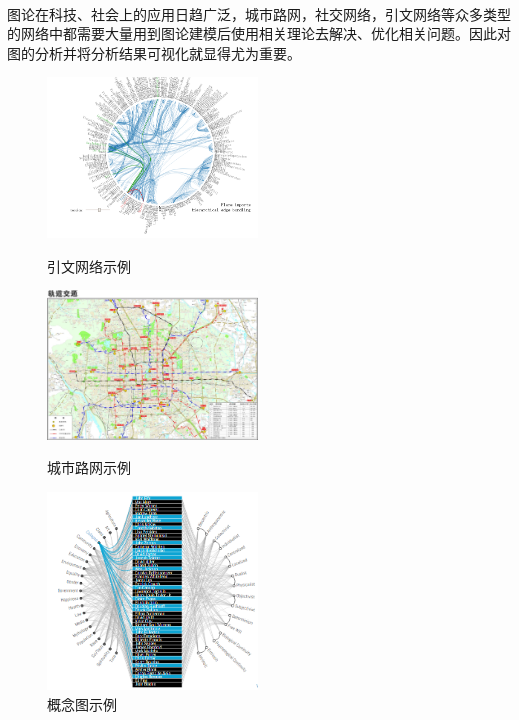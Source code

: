 \documentclass{article}
\begin{document}
\begin{CJK}{UTF8}{gkai}
	\paragraph{}
	图论在科技、社会上的应用日趋广泛，城市路网，社交网络，引文网络等众多类型的网络中都需要大量用到图论建模后使用相关理论去解决、优化相关问题。因此对图的分析并将分析结果可视化就显得尤为重要。
	\begin{figure}[htbp!]
		\begin{minipage}[t]{0.33\linewidth}
			\centering
			\includegraphics[width=2.2in]{graph.PNG}
			\caption{引文网络示例}
		\end{minipage}
		\begin{minipage}[t]{0.33\linewidth}
			\centering
			\includegraphics[width=2.2in]{graph_beijing_subway.jpg}
			\caption{城市路网示例}
		\end{minipage}
		\begin{minipage}[t]{0.33\linewidth}
			\centering
			\includegraphics[width=2.2in]{graph_concept.PNG}
			\caption{概念图示例}
		\end{minipage}
	\end{figure}


\end{CJK}
\end{document}
